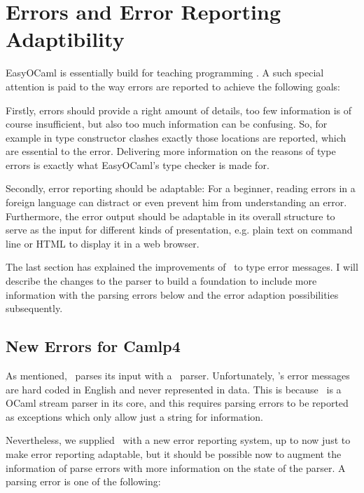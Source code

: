 
\section{Errors and Error Reporting Adaptibility}
\label{sec:errors}

EasyOCaml is essentially build for teaching programming . A such special
attention is paid to the way errors are reported to achieve the following
goals:

Firstly, errors should provide a right amount of details, too few information
is of course insufficient, but also too much information can be confusing. So,
for example in type constructor clashes exactly those locations are reported,
which are essential to the error.  Delivering more information on the reasons
of type errors is exactly what EasyOCaml's type checker is made for.

Secondly, error reporting should be adaptable: For a beginner, reading 
errors in a foreign language can distract or even prevent him from 
understanding an error. Furthermore, the error output should be adaptable in
its overall structure to serve as the input for different kinds of
presentation, e.g. plain text on command line or HTML to display it in a web
browser.

The last section has explained the improvements of \easyocaml\ to type 
error messages. I will describe the changes to the parser to build a foundation
to include more information with the parsing errors below and the error
adaption possibilities subsequently.


\subsection{New Errors for Camlp4}
\label{hd003001}
As mentioned, \easyocaml\ parses its input with a \camlpf\ parser.  
Unfortunately, \camlpf's error messages are hard coded in English and never
represented in data.  This is because \camlpf\ is a OCaml stream parser in its
core, and this requires parsing errors to be reported as exceptions which only
allow just a string for information.

Nevertheless, we supplied \camlpf\ with a new error reporting system, up 
to now just to make error reporting adaptable, but it should be possible 
now to augment the information of parse errors with more information on the
state of the parser. A parsing error is one of
the following:

